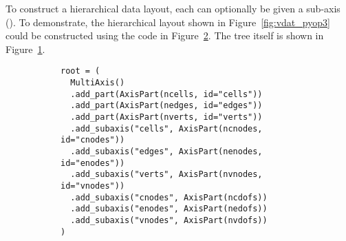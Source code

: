 To construct a hierarchical data layout, each  can optionally be given a sub-axis ().
To demonstrate, the hierarchical layout shown in Figure~\ref{fig:vdat_pyop3} could be constructed using the code in Figure~\ref{lis:demotreecode}.
The tree itself is shown in Figure~\ref{fig:vdat_tree}.

\begin{figure}
  \centering
  \begin{subfigure}{.9\textwidth}
    \centering
    \caption{}
    \label{fig:vdat_tree}
  \end{subfigure}

  \begin{subfigure}{.9\textwidth}
    \begin{verbatim}
root = (
  MultiAxis()
  .add_part(AxisPart(ncells, id="cells"))
  .add_part(AxisPart(nedges, id="edges"))
  .add_part(AxisPart(nverts, id="verts"))
  .add_subaxis("cells", AxisPart(ncnodes, id="cnodes"))
  .add_subaxis("edges", AxisPart(nenodes, id="enodes"))
  .add_subaxis("verts", AxisPart(nvnodes, id="vnodes"))
  .add_subaxis("cnodes", AxisPart(ncdofs))
  .add_subaxis("enodes", AxisPart(nedofs))
  .add_subaxis("vnodes", AxisPart(nvdofs))
)
    \end{verbatim}
    \caption{}
    \label{lis:demotreecode}
  \end{subfigure}
  \caption{}
  \label{fig:demotree}
\end{figure}

